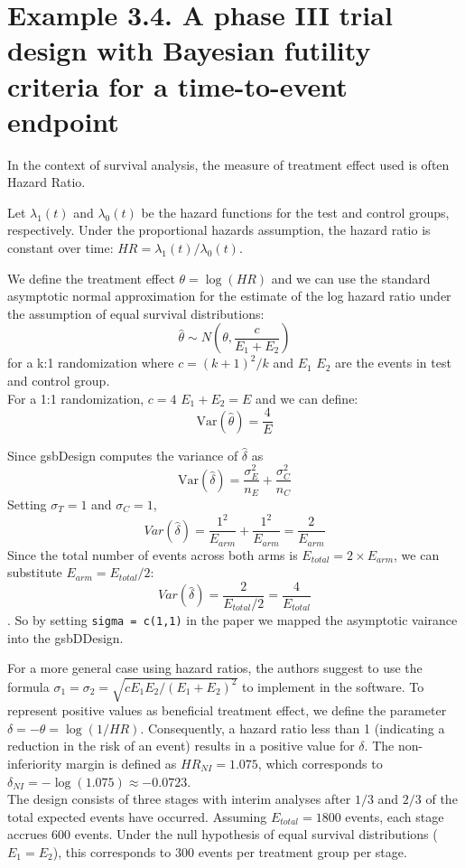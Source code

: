 \documentclass{article}\usepackage[]{graphicx}\usepackage[]{xcolor}
\begin{document}
\FloatBarrier 

\section{Example 3.4. A phase III trial design with Bayesian futility criteria for
a time-to-event endpoint}

In the context of survival analysis, the measure of treatment effect used is often Hazard Ratio. 

Let $\lambda_1(t)$ and $\lambda_0(t)$ be the hazard functions for the test and control groups, respectively.
Under the proportional hazards assumption, the hazard ratio is constant over time: $HR = \lambda_1(t) / \lambda_0(t)$.

We define the treatment effect $\theta = \log(HR)$ and we can use the standard asymptotic normal approximation for the estimate of the log hazard ratio 
under the assumption of equal survival distributions:
$$\hat{\theta} \sim N\left(\theta, \frac{c}{E_1 + E_2}\right)$$
for a k:1 randomization where $c = (k+1)^2 /k$ and $E_1$ $E_2$ are the events in test and control group. \\
For a 1:1 randomization, $c = 4$ $E_1 + E_2 = E$ and we can define: $$\text{Var}(\hat{\theta}) = \frac{4}{E}$$

Since gsbDesign computes the variance of $\hat{\delta}$ as $$\text{Var}(\hat{\delta}) = \frac{\sigma_E^2}{n_E} + \frac{\sigma_C^2}{n_C}$$
Setting $\sigma_T = 1$ and $\sigma_C = 1$,  $$Var(\hat{\delta}) = \frac{1^2}{E_{arm}} + \frac{1^2}{E_{arm}} = \frac{2}{E_{arm}}$$ Since the total number of events 
across both arms is $E_{total} = 2 \times E_{arm}$, we can substitute $E_{arm} = E_{total} / 2$: $$Var(\hat{\delta}) = \frac{2}{E_{total} / 2} = \frac{4}{E_{total}}$$.
So by setting \texttt{sigma = c(1,1)} in the paper we mapped the asymptotic vairance into the gsbDDesign.

For a more general case using hazard ratios, the authors suggest to use the formula $\sigma_1 = \sigma_2 = \sqrt{c E_1 E_2 / (E_1 + E_2)^2}$  to implement in the software. 
To represent positive values as beneficial treatment effect, we define the parameter $\delta = -\theta = \log(1/HR)$. Consequently, a hazard ratio less 
than 1 (indicating a reduction in the risk of an event) results in a positive value for $\delta$. The non-inferiority margin is defined as $HR_{NI} = 1.075$, 
which corresponds to $\delta_{NI} = -\log(1.075) \approx -0.0723$.\\

The design consists of three stages with interim analyses after $1/3$ and $2/3$ of the total expected events have occurred. Assuming $E_{total} = 1800$ events, 
each stage accrues 600 events. Under the null hypothesis of equal survival distributions ($E_1 = E_2$), this corresponds to 300 events per treatment group per stage. \\
\end{document}
